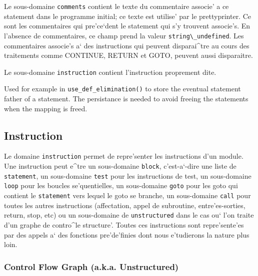 Le sous-domaine {\tt comments} contient le texte du commentaire associe'
a ce statement dans le programme initial; ce texte est utilise' par le
prettyprinter. Ce sont les commentaires qui pre'ce`dent le statement
qui s'y trouvent associe's. En l'absence de commentaires, ce champ
prend la valeur \verb/string\_undefined/. Les commentaires associe's a`
des instructions qui peuvent disparai^tre au cours des traitements comme
CONTINUE, RETURN et GOTO, peuvent aussi disparaitre.

Le sous-domaine \verb/instruction/ contient
l'instruction proprement dite.

{}

Used for example in \verb/use_def_elimination()/ to store the eventual
statement father of a statement. The persistance is needed to avoid
freeing the statements when the mapping is freed.

\subsection{Instruction}
\label{subsection-instruction}

{ 
Le domaine \verb/instruction/ permet de repre'senter les instructions
d'un module. Une instruction peut e^tre un sous-domaine \verb/block/,
c'est-a`-dire une liste de \verb/statement/, un sous-domaine \verb/test/
pour les instructions de test, un sous-domaine \verb/loop/ pour les
boucles se'quentielles, un sous-domaine \verb/goto/ pour les goto qui
contient le
\verb/statement/ vers lequel le goto se branche, un sous-domaine
\verb/call/ pour toutes les autres instructions (affectation, appel de
subroutine, entre'es-sorties, return, stop, etc) ou un sous-domaine de
\verb/unstructured/ dans le cas ou` l'on traite d'un graphe de contro^le
structure'. Toutes ces instructions 
sont repre'sente'es par des appels a` des fonctions pre'de'finies dont
nous e'tudierons la nature plus loin.
}

\subsubsection{Control Flow Graph (a.k.a. Unstructured)}
\label{subsubsection-unstructured}

